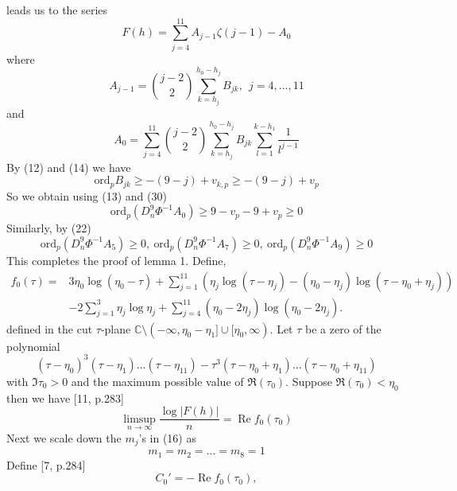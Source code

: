 \documentclass[12pt]{article}
\begin{document}
 leads us to the series \begin{equation}
     F(h)=\sum_{j=4}^{11}A_{j-1}\zeta(j-1)-A_0
 \end{equation}
 where \begin{equation}
     A_{j-1}=\binom{j-2}{2}\sum_{k=h_j}^{h_0-h_j}B_{jk},\ \ j=4,...,11
 \end{equation} and 
  \begin{equation}
     A_{0}=\sum_{j=4}^{11}\binom{j-2}{2}\sum_{k=h_j}^{h_0-h_j}B_{jk}\sum_{l=1}^{k-h_1} \frac{1}{l^{j-1}}
 \end{equation} 
 By (12) and (14) we have \begin{equation}
     \text{ord}_p B_{jk}\geq -(9-j)+v_{k,p}\geq -(9-j)+v_p
 \end{equation}  
 So we obtain using (13) and (30)
 \begin{equation}\text{ord}_p(D_n^9\Phi^{-1}A_0) \geq  9-v_p-9+v_p\geq 0\end{equation} 
 Similarly, by (22) \begin{equation}
     \text{ord}_p(D_n^9\Phi^{-1}A_5)\geq 0,\ \text{ord}_p(D_n^9\Phi^{-1}A_7)\geq 0,\ \text{ord}_p(D_n^9\Phi^{-1}A_9)\geq 0 
 \end{equation} 
 This completes the proof of lemma 1. Define, \begin{equation}
\begin{aligned}
f_0(\tau)
={}& 3\eta_0\log(\eta_0-\tau)
+\sum_{j=1}^{11}
\left(
\eta_j\log(\tau-\eta_j)
-(\eta_0-\eta_j)\log(\tau-\eta_0+\eta_j)
\right)\\
&-2\sum_{j=1}^{3}\eta_j\log\eta_j
+\sum_{j=4}^{11}
(\eta_0-2\eta_j)\log(\eta_0-2\eta_j).
\end{aligned}
\end{equation} defined in the cut $\tau$-plane $\mathbb{C}\setminus(-\infty,\eta_0-\eta_1]\cup[\eta_0,\infty)$. Let $\tau$ be a zero of the polynomial \begin{equation}
    (\tau-\eta_0)^3(\tau-\eta_1)...(\tau-\eta_{11})-\tau^3(\tau-\eta_0+\eta_1)...(\tau-\eta_0+\eta_{11})
\end{equation} 
with $\Im\tau_0>0$ and the maximum possible value of $\Re(\tau_0)$. Suppose $\Re(\tau_0)<\eta_0$ then we have [11, p.283] 
\begin{equation}
\limsup_{n\to\infty}
\frac{\log |F(h)|}{n}
=
\operatorname{Re} f_0(\tau_0)
\end{equation}
Next we scale down the $m_j$'s in (16) as \begin{equation}
    m_1=m_2=...=m_8=1
\end{equation}
Define [7, p.284] \begin{equation}
C_0'=-\operatorname{Re} f_0(\tau_0),
\end{equation}
\end{document}
